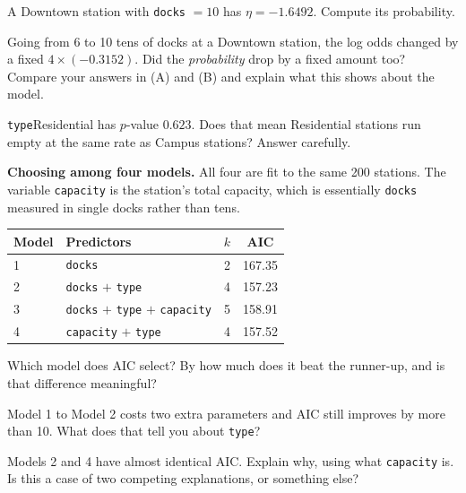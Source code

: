 \documentclass[11pt]{article}
\newcommand{\answerspace}[1]{\vspace{#1}}
\begin{document}
\begin{questions}
\begin{parts}
\item A Downtown station with \texttt{docks} $= 10$ has $\eta = -1.6492$. Compute its probability.
\answerspace{3em}

\item Going from 6 to 10 tens of docks at a Downtown station, the log odds changed by a fixed
$4 \times (-0.3152)$. Did the \emph{probability} drop by a fixed amount too? Compare your answers
in (A) and (B) and explain what this shows about the model.
\answerspace{4.5em}

\item \texttt{type}Residential has $p$-value $0.623$. Does that mean Residential stations run
empty at the same rate as Campus stations? Answer carefully.
\answerspace{4em}
\end{parts}

\item \textbf{Choosing among four models.} All four are fit to the same 200 stations. The variable
\texttt{capacity} is the station's total capacity, which is essentially \texttt{docks} measured in
single docks rather than tens.

\begin{center}
\renewcommand{\arraystretch}{1.35}
\begin{tabular}{llcc}
\toprule
\textbf{Model} & \textbf{Predictors} & \textbf{$k$} & \textbf{AIC} \\
\midrule
1 & \texttt{docks} & 2 & 167.35 \\
2 & \texttt{docks} $+$ \texttt{type} & 4 & 157.23 \\
3 & \texttt{docks} $+$ \texttt{type} $+$ \texttt{capacity} & 5 & 158.91 \\
4 & \texttt{capacity} $+$ \texttt{type} & 4 & 157.52 \\
\bottomrule
\end{tabular}
\end{center}

\begin{parts}
\item Which model does AIC select? By how much does it beat the runner-up, and is that difference
meaningful?
\answerspace{4em}

\item Model 1 to Model 2 costs two extra parameters and AIC still improves by more than 10. What
does that tell you about \texttt{type}?
\answerspace{3.5em}

\item Models 2 and 4 have almost identical AIC. Explain why, using what \texttt{capacity} is. Is
this a case of two competing explanations, or something else?
\answerspace{4.5em}


\end{parts}
\end{questions}
\end{document}
